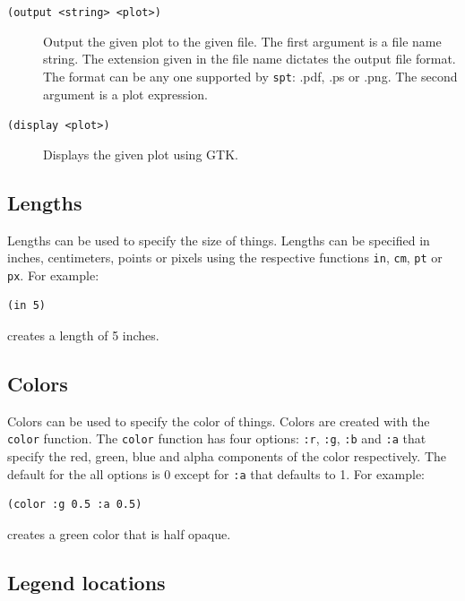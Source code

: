 \documentclass{article}
\begin{document}
\begin{description}

\item[{\tt (output <string> <plot>)}]
Output the given plot to the given
file.  The first argument is a file name string.  The extension given
in the file name dictates the output file format.  The format can be
any one supported by {\tt spt}: .pdf, .ps or .png.  The second
argument is a plot expression.

\item [{\tt (display <plot>)}] Displays the given plot using GTK.
\end{description}


\subsection{Lengths}

Lengths can be used to specify the size of things.  Lengths can be
specified in inches, centimeters, points or pixels using the
respective functions {\tt in}, {\tt cm}, {\tt pt} or {\tt px}.  For
example:
\begin{verbatim}
(in 5)
\end{verbatim}
creates a length of 5 inches.

\subsection{Colors}

Colors can be used to specify the color of things.  Colors are created
with the {\tt color} function.  The {\tt color} function has four
options: {\tt :r}, {\tt :g}, {\tt :b} and {\tt :a} that specify the
red, green, blue and alpha components of the color respectively.  The
default for the all options is 0 except for {\tt :a} that defaults to
1. For example:
\begin{verbatim}
(color :g 0.5 :a 0.5)
\end{verbatim}
creates a green color that is half opaque.


\subsection{Legend locations}
\end{document}
